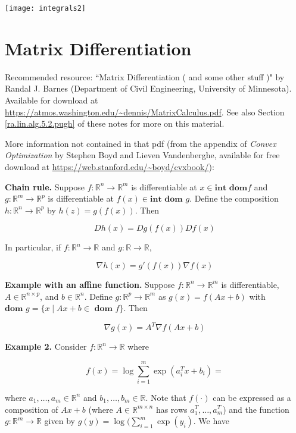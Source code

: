 \texttt{[image: integrals2]}

\section{Matrix Differentiation}\label{calc.mat.diff}

Recommended resource: ``Matrix Differentiation ( and some other stuff )" by Randal J. Barnes (Department of Civil Engineering, University of Minnesota). Available for download at \url{https://atmos.washington.edu/~dennis/MatrixCalculus.pdf}. See also Section \ref{ra.lin.alg.5.2.pugh} of these notes for more on this material.

More information not contained in that pdf (from the appendix of \textit{Convex Optimization} by Stephen Boyd and Lieven Vandenberghe, available for free download at \url{https://web.stanford.edu/~boyd/cvxbook/}):

\textbf{Chain rule.} Suppose \(f: \mathbb{R}^n \to \mathbb{R}^m\) is differentiable at \(x \in \textbf{int} \textbf{ dom} f\) and  \(g: \mathbb{R}^m \to \mathbb{R}^p\) is differentiable at \(f(x) \in \textbf{int} \textbf{ dom } g\). Define the composition \(h: \mathbb{R}^n \to \mathbb{R}^p\) by \(h(z) =  g(f(x))\). Then

\[
D h(x) = Dg(f(x)) D f(x)
\]

In particular, if \(f: \mathbb{R}^n \to \mathbb{R}\) and  \(g: \mathbb{R} \to \mathbb{R}\),

\[
\nabla h(x) = g'(f(x)) \nabla f(x)
\]

\textbf{Example with an affine function.} Suppose \(f: \mathbb{R}^n \to \mathbb{R}^m\) is differentiable, \(A \in \mathbb{R}^{n \times p}\), and \(b \in \mathbb{R}^n\). Define \(g: \mathbb{R}^p \to \mathbb{R}^m\) as \(g(x) = f(Ax + b)\) with \(\textbf{dom } g = \{x \mid Ax + b \in \textbf{ dom } f \}\). Then 

\[
\nabla g(x) = A^T \nabla f(Ax + b)
\]

\textbf{Example 2.} Consider \(f: \mathbb{R}^n \to \mathbb{R}\) where 

\[
f(x) = \log \sum_{i=1}^m \exp(a_i^Tx + b_i) = 
\]

where \(a_1, \ldots, a_m \in \mathbb{R}^n\)  and \(b_1, \ldots, b_m \in \mathbb{R}\). Note that \(f(\cdot)\) can be expressed as a composition of \(Ax + b\) (where \(A \in \mathbb{R}^{m \times n}\) has rows \(a_1^T , \ldots, a_m^T\)) and the function \(g: \mathbb{R}^m \to \mathbb{R}\) given by \(g(y) = \log( \sum_{i=1}^m \exp(y_i)\). We have

